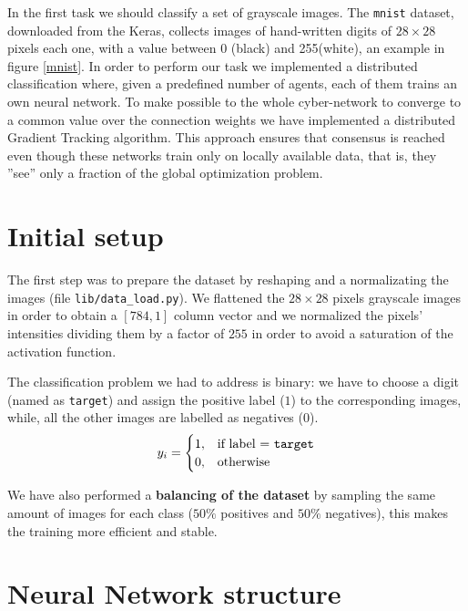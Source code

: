 \documentclass[a4paper,11pt,oneside]{book}
\begin{document}
In the first task we should classify a set of grayscale images. The \texttt{mnist} dataset, downloaded from the Keras, collects images of hand-written digits of $28\times28$ pixels each one, with a value between 0 (black) and 255(white), an example in figure \ref{mnist}. In order to perform our task we implemented a distributed classification where, given a predefined number of agents, each of them trains an own neural network. To make possible to the whole cyber-network to converge to a common value over the connection weights we have implemented a distributed Gradient Tracking algorithm. This approach ensures that consensus is reached even though these networks train only on locally available data, that is, they ''see'' only a fraction of the global optimization problem.

\section{Initial setup}
The first step was to prepare the dataset by reshaping and a normalizating the images (file \texttt{lib/data\_load.py}). We flattened the $28\times28$ pixels grayscale images in order to obtain a $[784,1]$ column vector and we normalized the pixels' intensities dividing them by a factor of $255$ in order to avoid a saturation of the activation function.

\bigskip
The classification problem we had to address is binary: we have to choose a digit (named as \texttt{target}) and assign the positive label ($1$) to the corresponding images, while, all the other images are labelled as negatives ($0$).
\begin{equation}
y_i = 
\begin{cases}
1, & \text{if label = \texttt{target}} \\
0, & \text{otherwise}
\end{cases}
\end{equation}

We have also performed a \textbf{balancing of the dataset} by sampling the same amount of images for each class ($50\%$ positives and $50\%$ negatives), this makes the training more efficient and stable.

\section{Neural Network structure}
\end{document}
